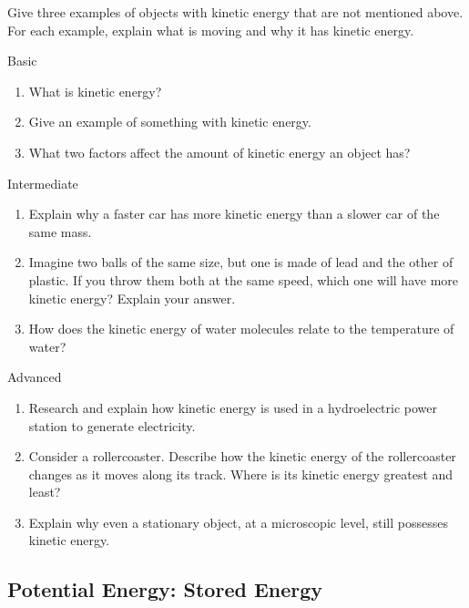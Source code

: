 \begin{stopandthink}
Give three examples of objects with kinetic energy that are not mentioned above. For each example, explain what is moving and why it has kinetic energy.
\end{stopandthink}

\begin{tieredquestions}{Basic}
\begin{enumerate}
    \item What is kinetic energy?
    \item Give an example of something with kinetic energy.
    \item What two factors affect the amount of kinetic energy an object has?
\end{enumerate}
\end{tieredquestions}

\begin{tieredquestions}{Intermediate}
\begin{enumerate}
    \item Explain why a faster car has more kinetic energy than a slower car of the same mass.
    \item Imagine two balls of the same size, but one is made of lead and the other of plastic. If you throw them both at the same speed, which one will have more kinetic energy? Explain your answer.
    \item How does the kinetic energy of water molecules relate to the temperature of water?
\end{enumerate}
\end{tieredquestions}

\begin{tieredquestions}{Advanced}
\begin{enumerate}
    \item Research and explain how kinetic energy is used in a hydroelectric power station to generate electricity.
    \item  Consider a rollercoaster. Describe how the kinetic energy of the rollercoaster changes as it moves along its track. Where is its kinetic energy greatest and least?
    \item  Explain why even a stationary object, at a microscopic level, still possesses kinetic energy.
\end{enumerate}
\end{tieredquestions}


\subsection{Potential Energy: Stored Energy}

